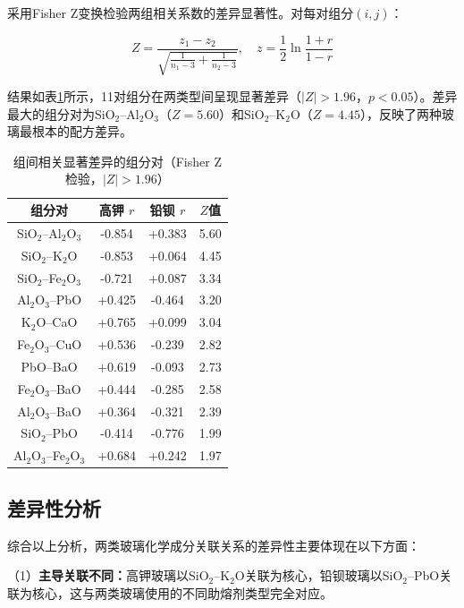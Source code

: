 \documentclass[fontset=windows, 12pt, a4paper]{ctexart}
\begin{document}
采用Fisher Z变换检验两组相关系数的差异显著性。对每对组分$(i,j)$：

\begin{equation}
Z = \frac{z_1 - z_2}{\sqrt{\frac{1}{n_1-3} + \frac{1}{n_2-3}}}, \quad z = \frac{1}{2}\ln\frac{1+r}{1-r}
\end{equation}

结果如表\ref{tab:fisher_z}所示，11对组分在两类型间呈现显著差异（$|Z|>1.96$，$p<0.05$）。差异最大的组分对为SiO$_2$--Al$_2$O$_3$（$Z=5.60$）和SiO$_2$--K$_2$O（$Z=4.45$），反映了两种玻璃最根本的配方差异。

\begin{table}[H]
\centering
\caption{组间相关显著差异的组分对（Fisher Z检验，$|Z|>1.96$）}
\label{tab:fisher_z}
\begin{tabular}{c|c|c|c}
\toprule
\textbf{组分对} & \textbf{高钾 $r$} & \textbf{铅钡 $r$} & \textbf{$Z$值} \\
\midrule
SiO$_2$--Al$_2$O$_3$ & -0.854 & +0.383 & 5.60 \\
SiO$_2$--K$_2$O    & -0.853 & +0.064 & 4.45 \\
SiO$_2$--Fe$_2$O$_3$ & -0.721 & +0.087 & 3.34 \\
Al$_2$O$_3$--PbO   & +0.425 & -0.464 & 3.20 \\
K$_2$O--CaO        & +0.765 & +0.099 & 3.04 \\
Fe$_2$O$_3$--CuO   & +0.536 & -0.239 & 2.82 \\
PbO--BaO           & +0.619 & -0.093 & 2.73 \\
Fe$_2$O$_3$--BaO   & +0.444 & -0.285 & 2.58 \\
Al$_2$O$_3$--BaO   & +0.364 & -0.321 & 2.39 \\
SiO$_2$--PbO       & -0.414 & -0.776 & 1.99 \\
Al$_2$O$_3$--Fe$_2$O$_3$ & +0.684 & +0.242 & 1.97 \\
\bottomrule
\end{tabular}
\end{table}

\subsection{差异性分析}

综合以上分析，两类玻璃化学成分关联关系的差异性主要体现在以下方面：

（1）\textbf{主导关联不同：}高钾玻璃以SiO$_2$--K$_2$O关联为核心，铅钡玻璃以SiO$_2$--PbO关联为核心，这与两类玻璃使用的不同助熔剂类型完全对应。
\end{document}
